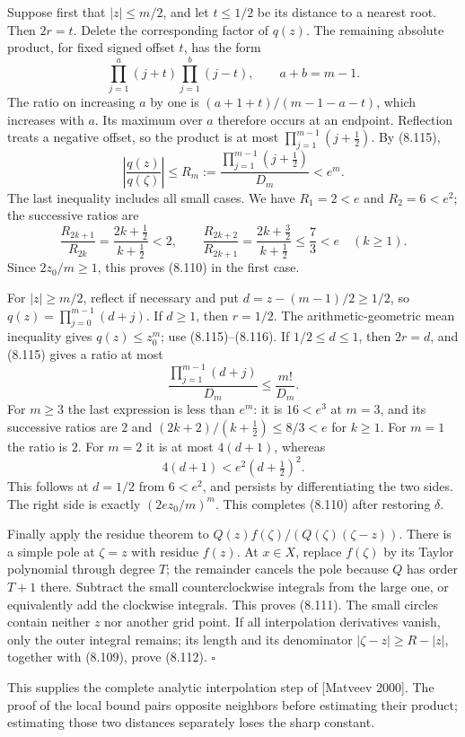 \documentclass[
  11pt,
  a4paper,
]{article}
\begin{document}
Suppose first that \(|z|\le m/2\), and let \(t\le1/2\) be its distance
to a nearest root. Then \(2r=t\). Delete the corresponding factor of
\(q(z)\). The remaining absolute product, for fixed signed offset \(t\),
has the form \[
\prod_{j=1}^{a}(j+t)\prod_{j=1}^{b}(j-t),\qquad a+b=m-1.
\] The ratio on increasing \(a\) by one is \((a+1+t)/(m-1-a-t)\), which
increases with \(a\). Its maximum over \(a\) therefore occurs at an
endpoint. Reflection treats a negative offset, so the product is at most
\(\prod_{j=1}^{m-1}(j+\tfrac12)\). By (8.115), \[
\left|\frac{q(z)}{q(\zeta)}\right|
\le R_m:=\frac{\prod_{j=1}^{m-1}(j+\tfrac12)}{D_m}<e^m.
\] The last inequality includes all small cases. We have \(R_1=2<e\) and
\(R_2=6<e^2\); the successive ratios are \[
\frac{R_{2k+1}}{R_{2k}}=\frac{2k+\tfrac12}{k+\tfrac12}<2,\qquad
\frac{R_{2k+2}}{R_{2k+1}}=\frac{2k+\tfrac32}{k+\tfrac12}\le\frac73<e
\quad(k\ge1).
\] Since \(2z_0/m\ge1\), this proves (8.110) in the first case.

For \(|z|\ge m/2\), reflect if necessary and put \(d=z-(m-1)/2\ge1/2\),
so \(q(z)=\prod_{j=0}^{m-1}(d+j)\). If \(d\ge1\), then \(r=1/2\). The
arithmetic-geometric mean inequality gives \(q(z)\le z_0^m\); use
(8.115)--(8.116). If \(1/2\le d\le1\), then \(2r=d\), and (8.115) gives
a ratio at most \[
\frac{\prod_{j=1}^{m-1}(d+j)}{D_m}\le\frac{m!}{D_m}.
\] For \(m\ge3\) the last expression is less than \(e^m\): it is
\(16<e^3\) at \(m=3\), and its successive ratios are \(2\) and
\((2k+2)/(k+\tfrac12)\le8/3<e\) for \(k\ge1\). For \(m=1\) the ratio is
\(2\). For \(m=2\) it is at most \(4(d+1)\), whereas \[
4(d+1)<e^2(d+\tfrac12)^2.
\] This follows at \(d=1/2\) from \(6<e^2\), and persists by
differentiating the two sides. The right side is exactly
\((2ez_0/m)^m\). This completes (8.110) after restoring \(\delta\).

Finally apply the residue theorem to
\(Q(z)f(\zeta)/(Q(\zeta)(\zeta-z))\). There is a simple pole at
\(\zeta=z\) with residue \(f(z)\). At \(x\in X\), replace \(f(\zeta)\)
by its Taylor polynomial through degree \(T\); the remainder cancels the
pole because \(Q\) has order \(T+1\) there. Subtract the small
counterclockwise integrals from the large one, or equivalently add the
clockwise integrals. This proves (8.111). The small circles contain
neither \(z\) nor another grid point. If all interpolation derivatives
vanish, only the outer integral remains; its length and its denominator
\(|\zeta-z|\ge R-|z|\), together with (8.109), prove (8.112).
\(\square\)

This supplies the complete analytic interpolation step of {[}Matveev
2000{]}. The proof of the local bound pairs opposite neighbors before
estimating their product; estimating those two distances separately
loses the sharp constant.
\end{document}
